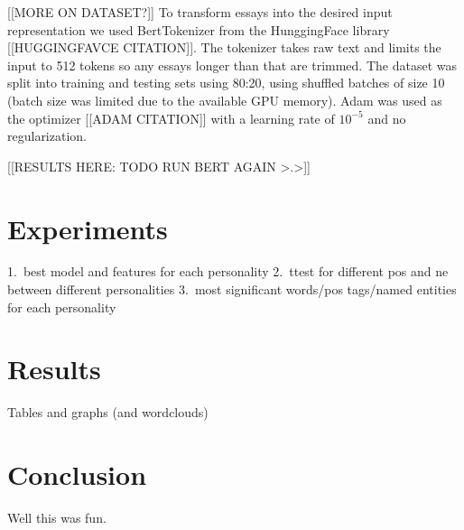 \documentclass[10pt, a4paper]{article}
\begin{document}
[[MORE ON DATASET?]] To transform essays into the desired input representation we used BertTokenizer from the HunggingFace library [[HUGGINGFAVCE CITATION]]. The tokenizer takes raw text and limits the input to 512 tokens so any essays longer than that are trimmed. The dataset was split into training and testing sets using 80:20, using shuffled batches of size 10 (batch size was limited due to the available GPU memory). Adam was used as the optimizer [[ADAM CITATION]] with a learning rate of $10^{-5}$ and no regularization.

[[RESULTS HERE: TODO RUN BERT AGAIN >.>]]

\section{Experiments}
1.\ best model and features for each personality
2.\ ttest for different pos and ne between different personalities
3.\ most significant words/pos tags/named entities for each personality

\section{Results}
Tables and graphs (and wordclouds)

\section{Conclusion}
Well this was fun.



\end{document}
